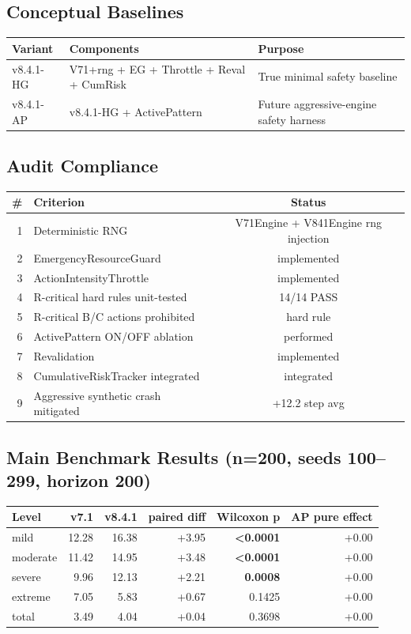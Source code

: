 \documentclass[11pt,a4paper]{article}
\begin{document}
\subsection{Conceptual Baselines}

\begin{tabular}{lll}
\toprule
\textbf{Variant} & \textbf{Components} & \textbf{Purpose} \\
\midrule
v8.4.1-HG & V71+rng + EG + Throttle + Reval + CumRisk & True minimal safety baseline \\
v8.4.1-AP & v8.4.1-HG + ActivePattern & Future aggressive-engine safety harness \\
\bottomrule
\end{tabular}

\subsection{Audit Compliance}

\begin{tabular}{rlc}
\toprule
\# & Criterion & Status \\
\midrule
1 & Deterministic RNG & V71Engine + V841Engine rng injection \\
2 & EmergencyResourceGuard & implemented \\
3 & ActionIntensityThrottle & implemented \\
4 & R-critical hard rules unit-tested & 14/14 PASS \\
5 & R-critical B/C actions prohibited & hard rule \\
6 & ActivePattern ON/OFF ablation & performed \\
7 & Revalidation & implemented \\
8 & CumulativeRiskTracker integrated & integrated \\
9 & Aggressive synthetic crash mitigated & +12.2 step avg \\
\bottomrule
\end{tabular}

\subsection{Main Benchmark Results (n=200, seeds 100--299, horizon 200)}

\begin{tabular}{lrrrrr}
\toprule
\textbf{Level} & \textbf{v7.1} & \textbf{v8.4.1} & \textbf{paired diff} & \textbf{Wilcoxon p} & \textbf{AP pure effect} \\
\midrule
mild     & 12.28 & 16.38 & +3.95 & \textbf{<0.0001} & +0.00 \\
moderate & 11.42 & 14.95 & +3.48 & \textbf{<0.0001} & +0.00 \\
severe   & 9.96  & 12.13 & +2.21 & \textbf{0.0008}  & +0.00 \\
extreme  & 7.05  & 5.83  & +0.67 & 0.1425           & +0.00 \\
total    & 3.49  & 4.04  & +0.04 & 0.3698           & +0.00 \\
\bottomrule
\end{tabular}
\end{document}
